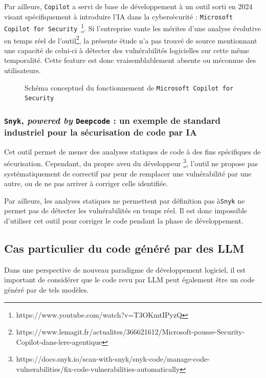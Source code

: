                 Par ailleurs, \texttt{Copilot} a servi de base de développement à un outil sorti
                en 2024 visant spécifiquement à introduire l'IA dans la cybersécurité : \texttt{Microsoft Copilot
                for Security }\footnote{https://www.youtube.com/watch?v=T3OKmtIPyzQ}. Si l'entreprise vante les
                mérites d'une analyse  évolutive en
                temps réel de l'outil\footnote{https://www.lemagit.fr/actualites/366621612/Microsoft-pousse-Security-Copilot-dans-lere-agentique}, la présente étude n'a pas trouvé de source
                mentionnant une capacité de celui-ci à détecter des vulnérabilités logicielles sur cette même
                temporalité. Cette feature est donc vraisemblablement absente ou méconnue des
                utilisateurs.
                \begin{figure}[H]
                    \centering
                    {}
                    \caption{Schéma conceptuel du fonctionnement de \texttt{Microsoft Copilot for Security}}
                \end{figure}
            \subsubsection{
\texttt{Snyk}, \textit{ powered by }
\texttt{Deepcode} : un exemple de standard industriel pour la sécurisation de code par IA}
                Cet outil permet de mener des analyses statiques de code à des fins spécifiques
                de sécurisation. Cependant, du propre aveu du développeur
                \footnote{https://docs.snyk.io/scan-with-snyk/snyk-code/manage-code-vulnerabilities/fix-code-vulnerabilities-automatically},
                l'outil ne propose pas systématiquement de correctif par peur de remplacer une
                vulnérabilité par une autre, ou de ne pas arriver à corriger celle identifiée.

                Par ailleurs, les analyses statiques ne permettent par définition pas à\texttt{Snyk} ne permet  pas de détecter les vulnérabilités en temps réel. Il est donc impossible d'utiliser cet outil pour corriger le code pendant la phase de développement.

        \subsection{Cas particulier du code généré par des LLM}
            Dans une perspective de nouveau paradigme de développement logiciel, il est
            important de considérer que le code revu par LLM peut également être un code généré
            par de tels modèles.

